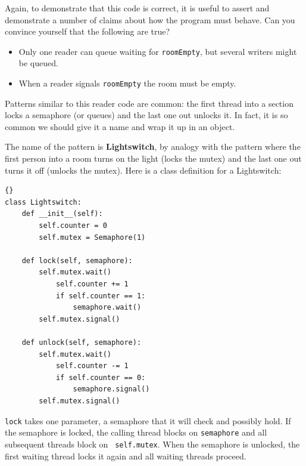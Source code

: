 \documentclass{book}
\begin{document}
Again, to demonstrate that this code is correct, it is useful
to assert and demonstrate a number of claims about how the program
must behave.  Can you convince yourself that the following are
true?

\begin{itemize}

\item Only one reader can queue waiting for {\tt roomEmpty},
but several writers might be queued.

\item When a reader signals {\tt roomEmpty} the room must
be empty.

\end{itemize}

Patterns similar to this reader code are common: the first thread into
a section locks a semaphore (or queues) and the last one out unlocks
it.  In fact, it is so common we should give it a name and wrap it up
in an object.

The name of the pattern is {\bf Lightswitch}, by analogy with the
pattern where the first person into a room turns on the light (locks
the mutex) and the last one out turns it off (unlocks the mutex).
Here is a class definition for a Lightswitch:

\begin{latin}
\begin{latin}
\begin{lstlisting}[title={Lightswitch definition}]{}
class Lightswitch:
    def __init__(self):
        self.counter = 0
        self.mutex = Semaphore(1)

    def lock(self, semaphore):
        self.mutex.wait()
            self.counter += 1
            if self.counter == 1:
                semaphore.wait()
        self.mutex.signal()

    def unlock(self, semaphore):
        self.mutex.wait()
            self.counter -= 1
            if self.counter == 0:
                semaphore.signal()
        self.mutex.signal()
\end{lstlisting}
\end{latin}
\end{latin}

{\tt lock} takes one parameter, a semaphore that it will check and
possibly hold.  If the semaphore is locked, the calling thread blocks
on {\tt semaphore} and all subsequent threads block on {\tt
self.mutex}.  When the semaphore is unlocked, the first waiting thread
locks it again and all waiting threads proceed.
\end{document}
